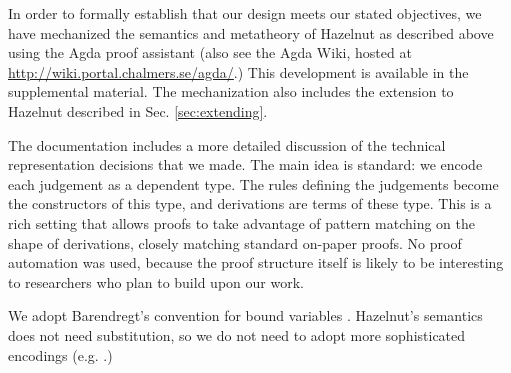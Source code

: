 
In order to
formally establish that our design meets our stated objectives, we have
mechanized the semantics and metatheory of Hazelnut as described above using the Agda proof
assistant \cite{norell:thesis} (also see the Agda Wiki, hosted
at \url{http://wiki.portal.chalmers.se/agda/}.) This development is available in the supplemental material. The mechanization also includes the  extension to Hazelnut described in Sec. \ref{sec:extending}.

The documentation includes a more detailed discussion of the technical
representation decisions that we made. The main idea is standard: we encode
each judgement as a dependent type. The rules defining the judgements
become the constructors of this type, and derivations are terms of these
type. This is a rich setting that allows proofs to take advantage of
pattern matching on the shape of derivations, closely matching standard
on-paper proofs. No proof automation was used, because the proof structure
itself is likely to be interesting to researchers who plan to build upon
our work.

We adopt Barendregt's convention for bound
variables \cite{urban}. Hazelnut's semantics does not need substitution, so
we do not need to adopt more sophisticated encodings
(e.g. \cite{lh09unibind,Pouillard11}.)
